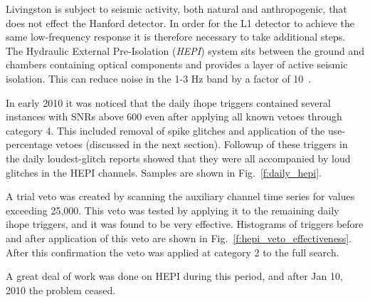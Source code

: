 
Livingston is subject to seismic activity, both natural and
anthropogenic, that does not effect the Hanford detector.  In order
for the L1 detector to achieve the same low-frequency response it is
therefore necessary to take additional steps.  The Hydraulic External
Pre-Isolation (\emph{HEPI}) system sits between the ground and
chambers containing optical components and provides a layer of active
seismic isolation.  This can reduce noise in the 1-3 Hz band by a
factor of 10~\cite{Wen:thesis}.

In early 2010 it was noticed that the daily ihope triggers contained
several instances with SNRs above 600 even after applying all known
vetoes through category 4.  This included removal of spike glitches
and application of the use-percentage vetoes (discussed in the next
section).  Followup of these triggers in the daily loudest-glitch
reports showed that they were all accompanied by loud glitches in the
HEPI channels.  Samples are shown in Fig.~\ref{f:daily_hepi}.

A trial veto was created by scanning the auxiliary channel time series
for values exceeding 25,000.  This veto was tested by applying it to
the remaining daily ihope triggers, and it was found to be very
effective.  Histograms of triggers before and after application of
this veto are shown in Fig.~\ref{f:hepi_veto_effectiveness}.  After
this confirmation the veto was applied at category 2 to the full
search.

A great deal of work was done on HEPI during this period, and after
Jan 10, 2010 the problem ceased.

%
%
%


